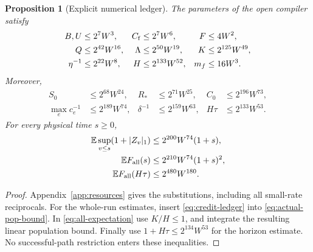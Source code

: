 \documentclass[11pt,reqno]{amsart}
\newtheorem{proposition}[theorem]{Proposition}
\theoremstyle{definition}
\theoremstyle{remark}
\newcommand{\E}{\mathbb E}
\begin{document}
\begin{proposition}[Explicit numerical ledger]\label{prop:ledger}
The parameters of the open compiler satisfy
\begin{align}
 B,U&\le2^7W^3,& C_{\rm f}&\le2^7W^6,&F&\le4W^2,\nonumber\\
 Q&\le2^{42}W^{16},&\Lambda&\le2^{50}W^{19},&K&\le2^{125}W^{49},\nonumber\\
 \eta^{-1}&\le2^{22}W^8,&H&\le2^{133}W^{52},&m_f&\le16W^3.
 \label{eq:parameter-ledger}
\end{align}
Moreover,
\begin{align}
 S_0&\le2^{68}W^{24},&R_*&\le2^{71}W^{25},&C_0&\le2^{196}W^{73},
 \label{eq:credit-ledger}\\
 \max_e c_e^{-1}&\le2^{189}W^{74},&
 \delta^{-1}&\le2^{159}W^{63},&
 H\tau&\le2^{133}W^{53}.\label{eq:precision-ledger}
\end{align}
For every physical time $s\ge0$,
\begin{align}
 \E\sup_{v\le s}(1+|Z_v|_1)&\le2^{200}W^{74}(1+s),\nonumber\\
 \E F_{\rm all}(s)&\le2^{210}W^{74}(1+s)^2,\nonumber\\
 \E F_{\rm all}(H\tau)&\le2^{480}W^{180}.\label{eq:cost-ledger}
\end{align}
\end{proposition}
\begin{proof}
Appendix~\ref{app:resources} gives the substitutions, including all small-rate
reciprocals. For the whole-run estimates, insert
\eqref{eq:credit-ledger} into \eqref{eq:actual-pop-bound}. In
\eqref{eq:all-expectation} use $K/H\le1$, and integrate the resulting linear
population bound. Finally use $1+H\tau\le2^{134}W^{53}$ for the horizon
estimate. No successful-path restriction enters these inequalities.
\end{proof}
\end{document}
